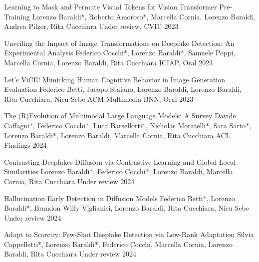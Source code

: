 \begin{cvpubblications}
    \cvpubblication
    {Learning to Mask and Permute Visual Tokens for Vision Transformer Pre-Training} %
    {Lorenzo Baraldi*, Roberto Amoroso*, Marcella Cornia, Lorenzo Baraldi, Andrea Pilzer, Rita Cucchiara} %
    {Under review, CVIU} %
    {2023} %

    \cvpubblication
    {Unveiling the Impact of Image Transformations on Deepfake Detection: An Experimental Analysis} %
    {Federico Cocchi*, Lorenzo Baraldi*, Samuele Poppi, Marcella Cornia, Lorenzo Baraldi, Rita Cucchiara} %
    {ICIAP, Oral} %
    {2023} %

    \cvpubblication
    {Let’s ViCE! Mimicking Human Cognitive Behavior in Image Generation Evaluation} %
    {Federico Betti, Jacopo Staiano, Lorenzo Baraldi, Lorenzo Baraldi, Rita Cucchiara, Nicu Sebe} %
    {ACM Multimedia BNN, Oral} %
    {2023} %

    \cvpubblication
    {The (R)Evolution of Multimodal Large Language Models: A Survey} %
    {Davide Caffagni*, Federico Cocchi*, Luca Barsellotti*, Nicholas Moratelli*, Sara Sarto*, Lorenzo Baraldi*, Lorenzo Baraldi, Marcella Cornia, Rita Cucchiara} %
    {ACL Findings} %
    {2024} %

    \cvpubblication
    {Contrasting Deepfakes Diffusion via Contrastive Learning and Global-Local Similarities} %
    {Lorenzo Baraldi*, Federico Cocchi*, Lorenzo Baraldi, Marcella Cornia, Rita Cucchiara} %
    {Under review} %
    {2024} %
    
    \cvpubblication
    {Hallucination Early Detection in Diffusion Models} %
    {Federico Betti*, Lorenzo Baraldi*, Brandon Willy Viglianisi,  Lorenzo Baraldi, Rita Cucchiara, Nicu Sebe} %
    {Under review} %
    {2024} %

    \cvpubblication
    {Adapt to Scarcity: Few-Shot Deepfake Detection via Low-Rank Adaptation} %
    {Silvia Cappelletti*, Lorenzo Baraldi*, Federico Cocchi,  Marcella Cornia, Lorenzo Baraldi, Rita Cucchiara} %
    {Under review} %
    {2024} %
    
\end{cvpubblications}


